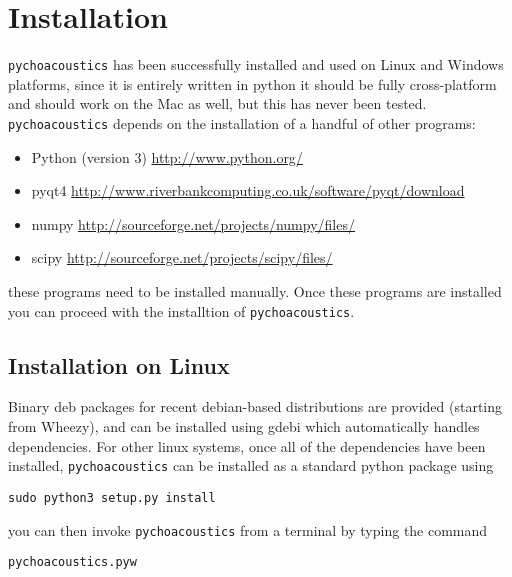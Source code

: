 \chapter{Installation}

\texttt{pychoacoustics} has been successfully installed and used on Linux and Windows platforms, since it is entirely written in python it should be fully cross-platform and should work on the Mac as well, but this has never been tested. \texttt{pychoacoustics} depends on the installation of a handful of other programs:
\begin{itemize}
\item Python (version 3) \href{http://www.python.org/}{http://www.python.org/}
\item pyqt4 \href{http://www.riverbankcomputing.co.uk/software/pyqt/download}{http://www.riverbankcomputing.co.uk/software/pyqt/download}
\item numpy \href{http://sourceforge.net/projects/numpy/files/}{http://sourceforge.net/projects/numpy/files/}
\item scipy \href{http://sourceforge.net/projects/scipy/files/}{http://sourceforge.net/projects/scipy/files/}
\end{itemize}
these programs need to be installed manually. Once these programs are installed you can proceed with the installtion of \texttt{pychoacoustics}. %

\section{Installation on Linux} 
Binary deb packages for recent debian-based distributions are provided (starting from Wheezy), and can be installed
using gdebi which automatically handles dependencies. For other linux systems,
once all of the dependencies have been installed,
\texttt{pychoacoustics} can be installed as a standard python package using
\begin{verbatim}
sudo python3 setup.py install
\end{verbatim}
you can then invoke \texttt{pychoacoustics} from a terminal by typing the command 
\begin{verbatim}
pychoacoustics.pyw
\end{verbatim}

